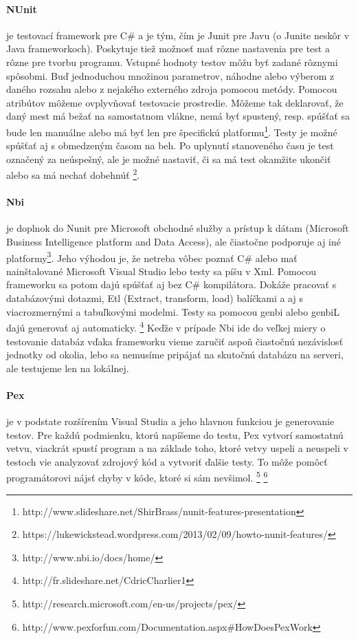 \documentclass[11pt,twoside,slovak,a4paper]{article}
\begin{document}
		\paragraph{NUnit} je testovací framework pre C\# a je tým, čím je Junit pre Javu (o Junite neskôr v Java frameworkoch).
		Poskytuje tiež možnosť mať rôzne nastavenia pre test a rôzne pre tvorbu programu.
		Vstupné hodnoty testov môžu byť zadané rôznymi spôsobmi. Buď jednoduchou množinou parametrov, náhodne alebo výberom z daného rozsahu alebo z nejakého externého zdroja pomocou metódy.
		Pomocou atribútov môžeme ovplyvňovať testovacie prostredie. Môžeme tak deklarovať, že daný mest má bežať na samostatnom vlákne, nemá byť spustený, resp. spúšťať sa bude len manuálne alebo má byť len pre špecifickú platformu\footnote{http://www.slideshare.net/ShirBrass/nunit-features-presentation}.
		Testy je možné spúšťať aj s obmedzeným časom na beh. Po uplynutí stanoveného času je test označený za neúspešný, ale je možné nastaviť, či sa má test okamžite ukončiť alebo sa má nechať dobehnúť \footnote{https://lukewickstead.wordpress.com/2013/02/09/howto-nunit-features/}.
		
		\paragraph{Nbi} je doplnok do Nunit pre Microsoft obchodné služby a prístup k dátam (Microsoft Business Intelligence platform and Data Access), ale čiastočne podporuje aj iné platformy\footnote{http://www.nbi.io/docs/home/}. Jeho výhodou je, že netreba vôbec poznať C\# alebo mať nainštalované Microsoft Visual Studio lebo testy sa píšu v Xml. Pomocou frameworku sa potom dajú spúšťať aj bez C\# kompilátora. Dokáže pracovať s databázovými dotazmi, Etl (Extract, transform, load) balíčkami a aj s viacrozmernými a tabuľkovými modelmi.
		Testy sa pomocou genbi alebo genbiL dajú generovať aj automaticky. \footnote{http://fr.slideshare.net/CdricCharlier1}
		Keďže v prípade Nbi ide do veľkej miery o testovanie databáz vďaka frameworku vieme zaručiť aspoň čiastočnú nezávislosť jednotky od okolia, lebo sa nemusíme pripájať na skutočnú databázu na serveri, ale testujeme len na lokálnej.
		
		
		\paragraph{Pex} je v podstate rozšírením Visual Studia a jeho hlavnou funkciou je generovanie testov. Pre každú podmienku, ktorú napíšeme do testu, Pex vytvorí samostatnú vetvu, viackrát spustí program a na základe toho, ktoré vetvy uspeli a neuspeli v testoch vie analyzovať zdrojový kód a vytvoriť ďalšie testy. To môže pomôcť programátorovi nájsť chyby v kóde, ktoré si sám nevšimol. \footnote{http://research.microsoft.com/en-us/projects/pex/}
		\footnote{http://www.pexforfun.com/Documentation.aspx\#HowDoesPexWork}
		
\end{document}
